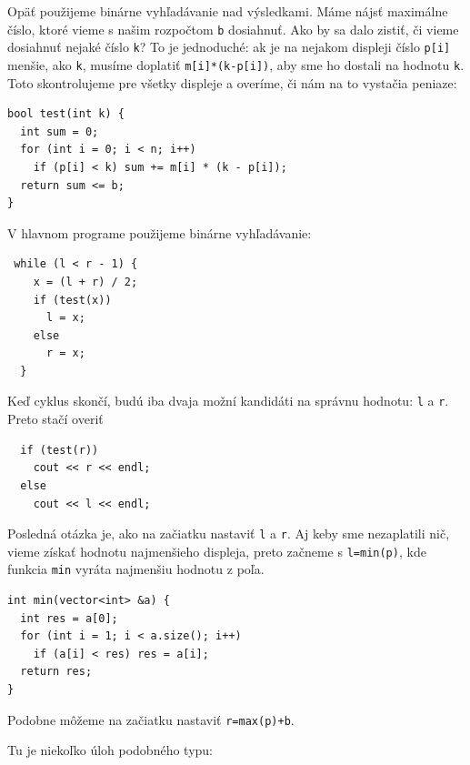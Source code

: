 \documentclass[10pt]{article}
\def\prg{\lstinline}
\def\ods{\vspace*{10pt}}
\begin{document}
Opäť použijeme binárne vyhľadávanie nad výsledkami. Máme nájsť maximálne číslo, ktoré
vieme s našim rozpočtom {\tt b} dosiahnuť. Ako by sa dalo zistiť, či vieme dosiahnuť
nejaké číslo {\tt k}? To je jednoduché: ak je na nejakom displeji číslo {\tt p[i]} menšie,
ako {\tt k}, musíme doplatiť {\tt m[i]*(k-p[i])}, aby sme ho dostali na hodnotu {\tt k}.
Toto skontrolujeme pre všetky displeje a overíme, či nám na to vystačia peniaze:

\begin{lstlisting}
bool test(int k) {
  int sum = 0;
  for (int i = 0; i < n; i++)
    if (p[i] < k) sum += m[i] * (k - p[i]);
  return sum <= b;
}
\end{lstlisting}

V hlavnom programe použijeme binárne vyhľadávanie:

\begin{lstlisting}
 while (l < r - 1) { 
    x = (l + r) / 2;
    if (test(x))
      l = x;
    else
      r = x;
  } 
\end{lstlisting}

Keď cyklus skončí, budú iba dvaja možní kandidáti na správnu hodnotu: {\tt l} a {\tt r}.
Preto stačí overiť

\begin{lstlisting}
  if (test(r))
    cout << r << endl;
  else
    cout << l << endl;
\end{lstlisting}

Posledná otázka je, ako na začiatku nastaviť {\tt l} a {\tt r}. Aj keby sme nezaplatili nič,
vieme získať hodnotu najmenšieho displeja, preto začneme s \prg!l=min(p)!, kde funkcia
{\tt min} vyráta najmenšiu hodnotu z poľa. 

\begin{lstlisting}
int min(vector<int> &a) {
  int res = a[0];
  for (int i = 1; i < a.size(); i++)
    if (a[i] < res) res = a[i];
  return res;
} 
\end{lstlisting}

Podobne môžeme na začiatku nastaviť \prg!r=max(p)+b!.

\ods Tu je niekoľko úloh podobného typu:
\end{document}
